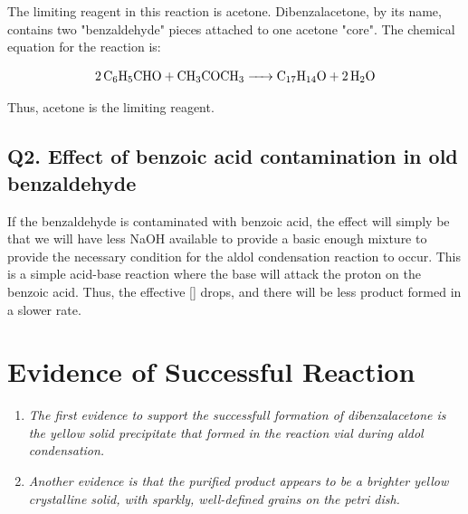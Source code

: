\documentclass[
  10pt,
  twocolumn,
  letterpaper,
]{article}
\begin{document}

The limiting reagent in this reaction is acetone. Dibenzalacetone, by its name, contains two "benzaldehyde" pieces attached to one acetone "core". The chemical equation for the reaction is:

\begin{equation}
  \ce{2 C6H5CHO + CH3COCH3 -> C17H14O + 2 H2O}
  \label{eq:reaction}
\end{equation}

Thus, acetone is the limiting reagent.


\subsection{Q2. Effect of benzoic acid contamination in old benzaldehyde}

If the benzaldehyde is contaminated with benzoic acid, the effect will simply be that we will have less NaOH available to provide a basic enough mixture to provide the necessary condition for the aldol condensation reaction to occur. This is a simple acid-base reaction where the base  will attack the proton on the benzoic acid. Thus, the effective [] drops, and there will be less product formed in a slower rate. 


\section{Evidence of Successful Reaction}


\begin{enumerate}
  \item \textit{The first evidence to support the successfull formation of dibenzalacetone is the yellow solid precipitate that formed in the reaction vial during aldol condensation.}
  \item \textit{Another evidence is that the purified product appears to be a brighter yellow crystalline solid, with sparkly, well-defined grains on the petri dish.}
\end{enumerate}


\end{document}
